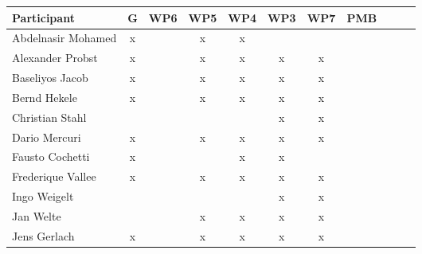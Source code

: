 \documentclass[a4paper, 11pt]{article}
\begin{document}
\begin{tabular}{|l|c|c|c|c||c|c|c||c|c|c|}
\hline
\textbf{Participant}  & \textbf{G} & \textbf{WP6} &  \textbf{WP5} & \textbf{WP4}&  \textbf{WP3} & \textbf{WP7}&  \textbf{PMB} \\\hline
Abdelnasir Mohamed    & x &   & x & x  &  &  &  \\\hline 
Alexander Probst      & x &   & x & x & x & x &   \\\hline  
Baseliyos Jacob       & x &   & x & x & x & x &  \\\hline 
Bernd Hekele          & x &   & x & x & x & x &  \\\hline
Christian Stahl      &   &   &  &  & x & x  &   \\\hline
Dario Mercuri        & x &   & x & x & x & x &   \\\hline
Fausto Cochetti      & x  &   &   & x & x &  &  \\\hline
Frederique Vallee      & x  &   &  x & x & x & x &  \\\hline
Ingo Weigelt         &   &   &  &  & x & x &   \\\hline
Jan Welte            &  &   & x & x & x & x &  \\\hline
Jens Gerlach         & x  &   & x & x & x &  x &   \\\hline

\end{tabular}
\end{document}

